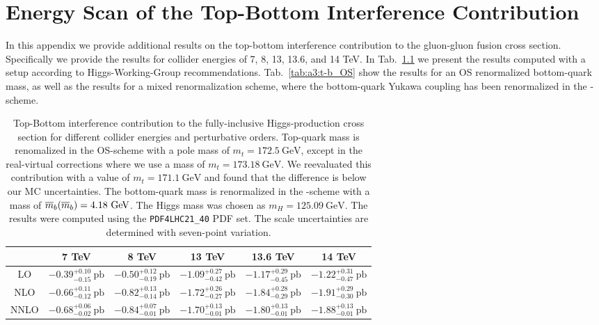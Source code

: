 

\chapter{Energy Scan of the Top-Bottom Interference Contribution}\label{app:3}

In this appendix we provide additional results on the top-bottom interference contribution to the gluon-gluon fusion cross section. Specifically we provide the results for collider energies of 7, 8, 13, 13.6, and 14 TeV. In Tab.~\ref{tab:a3:t-b_MS} we present the results computed with a setup according to Higgs-Working-Group recommendations. Tab.~\ref{tab:a3:t-b_OS} show the results for an \acs{OS} renormalized bottom-quark mass, as well as the results for a mixed renormalization scheme, where the bottom-quark Yukawa coupling has been renormalized in the \MS-scheme.

\begin{table}[ht]
\centering
\begin{tabular}{cccccc}
& 7 TeV  & 8 TeV & 13 TeV & 13.6 TeV & 14 TeV  \\
\hline
LO & $-0.39^{+0.10}_{-0.15} \ \text{pb}$ & $-0.50^{+0.12}_{-0.19} \ \text{pb}$ & $-1.09^{+0.27}_{-0.42} \ \text{pb}$ & $-1.17^{+0.29}_{-0.45} \ \text{pb}$ & $-1.22^{+0.31}_{-0.47} \ \text{pb}$  \\
NLO & $-0.66^{+0.11}_{-0.12} \ \text{pb}$ & $-0.82^{+0.13}_{-0.14} \ \text{pb}$ & $-1.72^{+0.26}_{-0.27} \ \text{pb}$ & $-1.84^{+0.28}_{-0.29} \ \text{pb}$ & $-1.91^{+0.29}_{-0.30} \ \text{pb}$ \\
NNLO & $-0.68^{+0.06}_{-0.02} \ \text{pb}$ & $-0.84^{+0.07}_{-0.01} \ \text{pb}$ & $-1.70^{+0.13}_{-0.01} \ \text{pb}$ & $-1.80^{+0.13}_{-0.01} \ \text{pb}$ & $-1.88^{+0.13}_{-0.01} \ \text{pb}$ \\
\end{tabular}
\caption{Top-Bottom interference contribution to the fully-inclusive Higgs-production cross section for different collider energies and perturbative orders. Top-quark mass is renomalized in the \acs{OS}-scheme with a pole mass of $m_t = 172.5\ \mathrm{GeV}$, except in the real-virtual corrections where we use a mass of $m_t = 173.18\ \mathrm{GeV}$. We reevaluated this contribution with a value of $m_t = 171.1\ \mathrm{GeV}$ and found that the difference is below our \acs{MC} uncertainties. The bottom-quark mass is renormalized in the \MS-scheme with a mass of $\overline{m}_{b}\!\left(\overline{m}_{b} \right) = 4.18\ \mathrm{GeV}$. The Higgs mass was chosen as $m_H = 125.09 \ \mathrm{GeV}$. The results were computed using the \texttt{PDF4LHC21\_40} \acs{PDF} set. The scale uncertainties are determined with seven-point variation.}
\label{tab:a3:t-b_MS}
\end{table}


